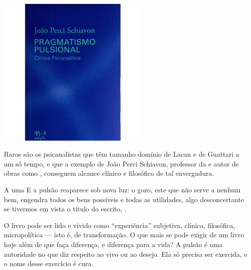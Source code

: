\pagebreak %


\begin{center}

\hspace*{.5cm}\includegraphics[width=74mm]{./grid/gozo.jpg}
\end{center}

\hspace*{-7cm}\hrulefill\hspace*{-7cm}

\medskip

\noindent{}Raros são os psicanalistas que têm tamanho domínio de Lacan e de Guattari a um só tempo, e que a exemplo de João Perci Schiavon, professor da  e autor de obras como {}, conseguem alcance clínico e filosófico de tal envergadura.  

A uma  E a pulsão reaparece sob nova luz: o gozo, este que não serve a nenhum bem, engendra todos os bens possíveis e todas as utilidades, algo desconcertante se tivermos em vista o título do escrito, {}.

O livro pode ser lido e vivido como “experiência” subjetiva, clínica, filosófica, micropolítica --- isto é, de transformação. O que mais se pode exigir de um livro hoje além de que faça diferença, e diferença para a vida? A pulsão é uma autoridade no que diz respeito ao vivo ou ao desejo. Ela só precisa ser exercida, e o nome desse exercício é cura.

\vfill

\hspace*{-.4cm}\begin{minipage}[c]{.8\linewidth}
\small{
{}}
\end{minipage}

